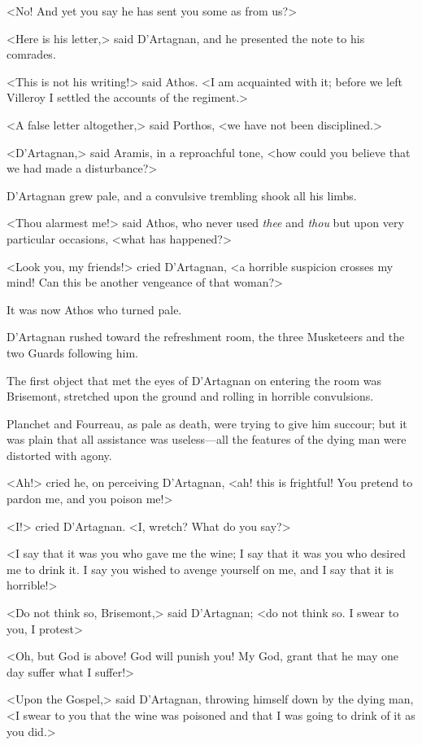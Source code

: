 <No! And yet you say he has sent you some as from us?> 

<Here is his letter,> said D'Artagnan, and he presented the note to his comrades. 

<This is not his writing!> said Athos. <I am acquainted with it; before we left Villeroy I settled the accounts of the regiment.> 

<A false letter altogether,> said Porthos, <we have not been disciplined.> 

<D'Artagnan,> said Aramis, in a reproachful tone, <how could you believe that we had made a disturbance?> 

D'Artagnan grew pale, and a convulsive trembling shook all his limbs. 

<Thou alarmest me!> said Athos, who never used \emph{thee} and \emph{thou} but upon very particular occasions, <what has happened?> 

<Look you, my friends!> cried D'Artagnan, <a horrible suspicion crosses my mind! Can this be another vengeance of that woman?> 

It was now Athos who turned pale. 

D'Artagnan rushed toward the refreshment room, the three Musketeers and the two Guards following him. 

The first object that met the eyes of D'Artagnan on entering the room was Brisemont, stretched upon the ground and rolling in horrible convulsions. 

Planchet and Fourreau, as pale as death, were trying to give him succour; but it was plain that all assistance was useless—all the features of the dying man were distorted with agony. 

<Ah!> cried he, on perceiving D'Artagnan, <ah! this is frightful! You pretend to pardon me, and you poison me!> 

<I!> cried D'Artagnan. <I, wretch? What do you say?> 

<I say that it was you who gave me the wine; I say that it was you who desired me to drink it. I say you wished to avenge yourself on me, and I say that it is horrible!> 

<Do not think so, Brisemont,> said D'Artagnan; <do not think so. I swear to you, I protest\longdash> 

<Oh, but God is above! God will punish you! My God, grant that he may one day suffer what I suffer!> 

<Upon the Gospel,> said D'Artagnan, throwing himself down by the dying man, <I swear to you that the wine was poisoned and that I was going to drink of it as you did.> 

